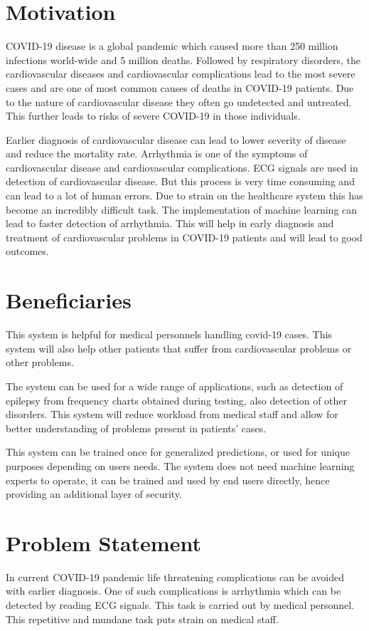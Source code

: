 \section{Motivation} \label{sec:motivation}

COVID-19 disease is a global pandemic which caused more than 250 million infections world-wide
and 5 million deaths. Followed by respiratory disorders, the cardiovascular diseases and
cardiovascular complications lead to the most severe cases and are one of most common causes of
deaths in COVID-19 patients. Due to the nature of cardiovascular disease they often go
undetected and untreated. This further leads to risks of severe COVID-19 in those individuals.

Earlier diagnosis of cardiovascular disease can lead to lower severity of disease and reduce
the mortality rate. Arrhythmia is one of the symptoms of cardiovascular disease and
cardiovascular complications. ECG signals are used in detection of cardiovascular disease. But
this process is very time consuming and can lead to a lot of human errors. Due to strain on the
healthcare system this has become an incredibly difficult task. The implementation of machine
learning can lead to faster detection of arrhythmia. This will help in early diagnosis and
treatment of cardiovascular problems in COVID-19 patients and will lead to good outcomes.


\section{Beneficiaries} \label{sec:beneficiaries}

This system is helpful for medical personnels handling covid-19 cases. This system will also
help other patients that suffer from cardiovascular problems or other problems.

The system can be used for a wide range of applications, such as detection of epilepsy from
frequency charts obtained during testing, also detection of other disorders. This system will
reduce workload from medical staff and allow for better understanding of problems present in
patients' cases.

This system can be trained once for generalized predictions, or used for unique purposes
depending on users needs. The system does not need machine learning experts to operate, it can
be trained and used by end users directly, hence providing an additional layer of security.


\section{Problem Statement} \label{sec:problem_statement}
In current COVID-19 pandemic life threatening complications can be avoided with earlier
diagnosis. One of such complications is arrhythmia which can be detected by reading ECG signals.
This task is carried out by medical personnel. This repetitive and mundane task puts strain on
medical staff.

